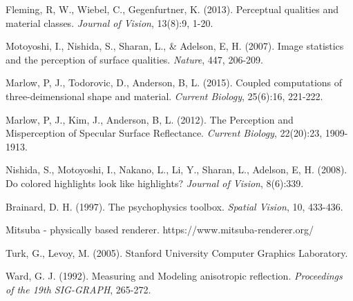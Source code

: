 \begin{thebibliography}{9}%

    Fleming, R, W., Wiebel, C., Gegenfurtner, K. (2013).
    Perceptual qualities and material classes.
    {\it Journal of Vision}, 13(8):9, 1-20.

    Motoyoshi, I., Nishida, S., Sharan, L., & Adelson, E, H. (2007).
    Image statistics and the perception of surface qualities.
    {\it Nature}, 447, 206-209.

    Marlow, P, J., Todorovic, D., Anderson, B, L. (2015).
    Coupled computations of three-deimensional shape and material.
    {\it Current Biology}, 25(6):16, 221-222.

    Marlow, P, J., Kim, J., Anderson, B, L. (2012).
    The Perception and Misperception of Specular Surface Reflectance.
    {\it Current Biology}, 22(20):23, 1909-1913.

    Nishida, S., Motoyoshi, I., Nakano, L., Li, Y., Sharan, L., Adelson, E, H. (2008).
    Do colored highlights look like highlights?
    {\it Journal of Vision}, 8(6):339.

    Brainard, D. H. (1997).
    The psychophysics toolbox.
    {\it Spatial Vision}, 10, 433-436.

    Mitsuba - physically based renderer. https://www.mitsuba-renderer.org/

    Turk, G., Levoy, M. (2005).
    Stanford University Computer Graphics Laboratory.

    Ward, G. J. (1992).
    Measuring and Modeling anisotropic reflection.
    {\it Proceedings of the 19th SIG-GRAPH}, 265-272.



\end{thebibliography}

